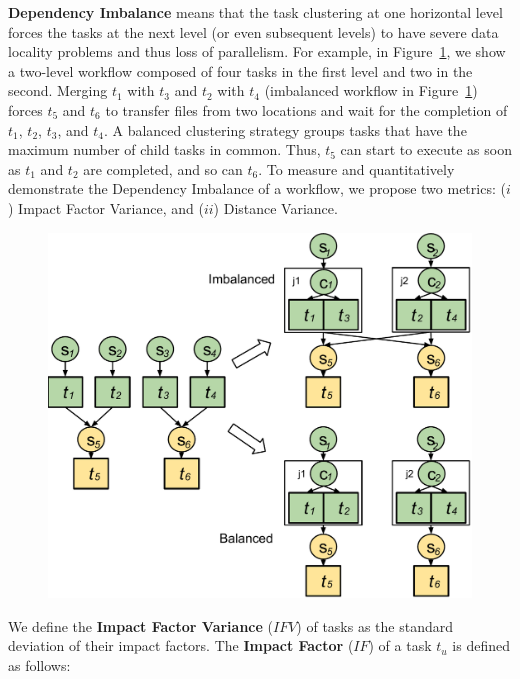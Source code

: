 \textbf{Dependency Imbalance} means that the task clustering at one horizontal level forces the tasks at the next level (or even subsequent levels) to have severe data locality problems and thus loss of parallelism. For example, in Figure~\ref{fig:imbalance_dv}, we show a two-level workflow composed of four tasks in the first level and two in the second. Merging $t_1$ with $t_3$ and $t_2$ with $t_4$ (imbalanced workflow in Figure~\ref{fig:imbalance_dv}) forces $t_5$ and $t_6$ to transfer files from two locations and wait for the completion of $t_1$, $t_2$, $t_3$, and $t_4$.  A balanced clustering strategy groups tasks that have the maximum number of child tasks in common. Thus, $t_5$ can start to execute as soon as $t_1$ and $t_2$ are completed, and so can $t_6$. To measure and quantitatively demonstrate the Dependency Imbalance of a workflow, we propose two  metrics: ($i$) Impact Factor Variance, and ($ii$) Distance Variance. 

\begin{figure}[htb]
	\centering
	\includegraphics[width=0.95\linewidth]{figures/balance/figure6.pdf}
	\label{fig:imbalance_dv}
\end{figure}

We define the \textbf{Impact Factor Variance} ($IFV$) of tasks as the standard deviation of their impact factors. The \textbf{Impact Factor} ($IF$) of a task $t_u$ is defined as follows:

